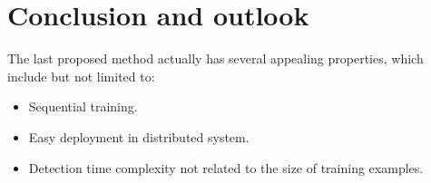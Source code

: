 \chapter{Conclusion and outlook}
\label{chp6}


The last proposed method actually has several appealing properties, which include but not limited to:
\begin{itemize}
\item {Sequential training.}
\item {Easy deployment in distributed system.}
\item {Detection time complexity not related to the size of training examples.}
\end{itemize}
